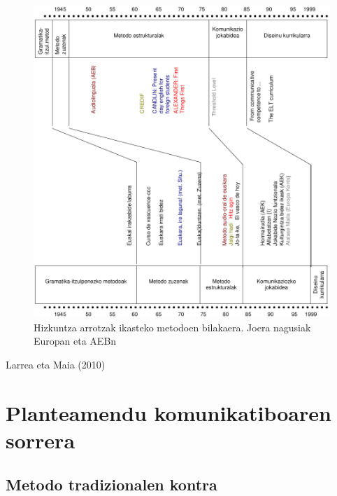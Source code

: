 \documentclass[
]{book}
\begin{document}
\begin{figure}
\centering
\includegraphics{../liburua/assets/07/07-Hizkuntzak_ikasteko_metodoen_joerak.png}
\caption{Hizkuntza arrotzak ikasteko metodoen bilakaera. Joera nagusiak Europan eta AEBn}
\end{figure}

Larrea eta Maia (2010)

\hypertarget{planteamendu-komunikatiboaren-sorrera}{%
\chapter{Planteamendu komunikatiboaren sorrera}\label{planteamendu-komunikatiboaren-sorrera}}

\hypertarget{metodo-tradizionalen-kontra}{%
\section{Metodo tradizionalen kontra}\label{metodo-tradizionalen-kontra}}
\end{document}
